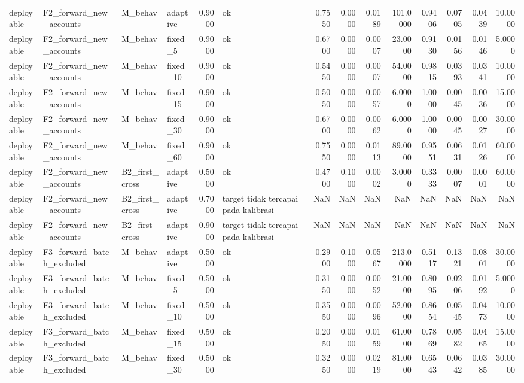\begin{table}
\begin{tabular}{llllrlrrrrrrrr}
deployable & F2\_forward\_new\_accounts & M\_behav & adaptive & 0.9000 & ok & 0.7550 & 0.0000 & 0.0189 & 101.0000 & 0.9406 & 0.0705 & 0.0439 & 10.0000 \\
deployable & F2\_forward\_new\_accounts & M\_behav & fixed\_5 & 0.9000 & ok & 0.6700 & 0.0000 & 0.0007 & 23.0000 & 0.9130 & 0.0156 & 0.0146 & 5.0000 \\
deployable & F2\_forward\_new\_accounts & M\_behav & fixed\_10 & 0.9000 & ok & 0.5450 & 0.0000 & 0.0007 & 54.0000 & 0.9815 & 0.0393 & 0.0341 & 10.0000 \\
deployable & F2\_forward\_new\_accounts & M\_behav & fixed\_15 & 0.9000 & ok & 0.5050 & 0.0000 & 0.0057 & 6.0000 & 1.0000 & 0.0045 & 0.0036 & 15.0000 \\
deployable & F2\_forward\_new\_accounts & M\_behav & fixed\_30 & 0.9000 & ok & 0.6700 & 0.0000 & 0.0062 & 6.0000 & 1.0000 & 0.0045 & 0.0027 & 30.0000 \\
deployable & F2\_forward\_new\_accounts & M\_behav & fixed\_60 & 0.9000 & ok & 0.7550 & 0.0000 & 0.0113 & 89.0000 & 0.9551 & 0.0631 & 0.0126 & 60.0000 \\
deployable & F2\_forward\_new\_accounts & B2\_first\_cross & adaptive & 0.5000 & ok & 0.4700 & 0.1000 & 0.0002 & 3.0000 & 0.3333 & 0.0007 & 0.0001 & 60.0000 \\
deployable & F2\_forward\_new\_accounts & B2\_first\_cross & adaptive & 0.7000 & target tidak tercapai pada kalibrasi & NaN & NaN & NaN & NaN & NaN & NaN & NaN & NaN \\
deployable & F2\_forward\_new\_accounts & B2\_first\_cross & adaptive & 0.9000 & target tidak tercapai pada kalibrasi & NaN & NaN & NaN & NaN & NaN & NaN & NaN & NaN \\
deployable & F3\_forward\_batch\_excluded & M\_behav & adaptive & 0.5000 & ok & 0.2900 & 0.1000 & 0.0567 & 213.0000 & 0.5117 & 0.1321 & 0.0801 & 30.0000 \\
deployable & F3\_forward\_batch\_excluded & M\_behav & fixed\_5 & 0.5000 & ok & 0.3150 & 0.0000 & 0.0052 & 21.0000 & 0.8095 & 0.0206 & 0.0192 & 5.0000 \\
deployable & F3\_forward\_batch\_excluded & M\_behav & fixed\_10 & 0.5000 & ok & 0.3550 & 0.0000 & 0.0096 & 52.0000 & 0.8654 & 0.0545 & 0.0473 & 10.0000 \\
deployable & F3\_forward\_batch\_excluded & M\_behav & fixed\_15 & 0.5000 & ok & 0.2050 & 0.0000 & 0.0159 & 61.0000 & 0.7869 & 0.0582 & 0.0465 & 15.0000 \\
deployable & F3\_forward\_batch\_excluded & M\_behav & fixed\_30 & 0.5000 & ok & 0.3250 & 0.0000 & 0.0219 & 81.0000 & 0.6543 & 0.0642 & 0.0385 & 30.0000 \\

\end{tabular}
\end{table}

